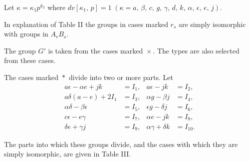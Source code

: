 \documentclass[oneside]{article}
\begin{document}
Let $\kappa = \kappa_1 p^{k_2}$ where $dv[\kappa_1,\, p] = 1\; (\kappa = a,\,
\beta,\, c,\, g,\, \gamma,\, d,\, k,\, \alpha,\, \epsilon,\, e,\, j)$.

In explanation of Table II the groups in cases marked
$\boxed{r_s}$ are simply isomorphic with groups in $A_r B_s$.

The group $G'$ is taken from the cases marked
$\boxed{\times}$. The types are also selected from these cases.

The cases marked $\boxed{*}$ divide into two or more parts. Let
\begin{align*}
a\epsilon - \alpha e + jk &= I_1,    & a\epsilon - jk &= I_2, \\
a\delta(a - e) + 2I_1 &= I_3,        & \alpha g - \beta j &= I_4, \\
\alpha\delta - \beta\epsilon &= I_5, & \epsilon g - \delta j &= I_6, \\
c\epsilon - e\gamma &= I_7,          & \alpha e - jk &= I_8, \\
\delta e + \gamma j &= I_9,          & \alpha\gamma + \delta k &= I_{10}.
\end{align*}

The parts into which these groups divide, and the cases with which they are
simply isomorphic, are given in Table III.
\end{document}
